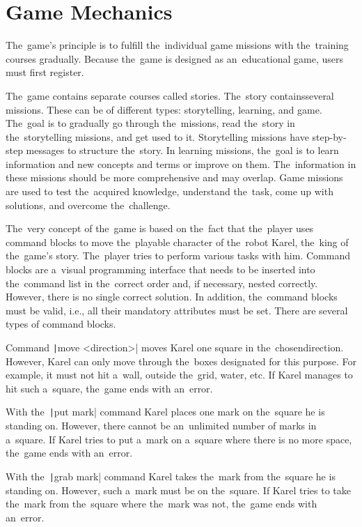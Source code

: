 \section{Game Mechanics}

The~game's principle is to fulfill the~individual game missions with the~training courses gradually.
Because the~game is designed as an~educational game, users must first register.

The~game contains separate courses called stories.
The~story contains\linebreak{}several missions.
These can be of different types: storytelling, learning, and game.
The~goal is to gradually go through the~missions, read the~story in the~storytelling missions, and get used to it.
Storytelling missions have step-by-step messages to structure the~story.
In learning missions, the~goal is to learn information and new concepts and terms or improve on them.
\linebreak
The~information in these missions should be more comprehensive and may overlap.
Game missions are used to test the~acquired knowledge, understand the~task, come up with solutions, and overcome the~challenge.

The~very concept of the~game is based on the~fact that the~player uses command blocks to move the~playable character of the~robot Karel, the~king of the~game's story.
The~player tries to perform various tasks with him.
Command blocks are a~visual programming interface that needs to be inserted into the~command list in the~correct order and, if necessary, nested correctly.
However, there is no single correct solution.
In addition, the~command blocks must be valid, i.e., all their mandatory attributes must be set.
There are several types of command blocks.

Command \texttt|move <direction>| moves Karel one square in the~chosen\linebreak{}direction.
However, Karel can only move through the~boxes designated for this purpose.
For example, it must not hit a~wall, outside the~grid, water, etc.
If Karel manages to hit such a~square, the~game ends with an~error.

With the~\texttt|put mark| command Karel places one mark on the~square he is standing on.
However, there cannot be an~unlimited number of marks in a~square.
If Karel tries to put a~mark on a~square where there is no more space, the~game ends with an~error.

With the~\texttt|grab mark| command Karel takes the~mark from the~square he is standing on.
However, such a~mark must be on the~square.
If Karel tries to take the~mark from the~square where the~mark was not, the~game ends with an~error.


